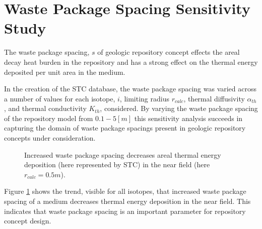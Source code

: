 \section{Waste Package Spacing Sensitivity Study}\label{sec:diffusivity}
The waste package spacing, $s$ of geologic repository concept effects the areal 
decay heat burden in the repository and has a strong effect on the thermal 
energy deposited per unit area in the medium. 

In the creation of the \gls{STC} database, the waste package spacing was varied 
across a number of values for each isotope, $i$, limiting 
radius $r_{calc}$, thermal diffusivity $\alpha_{th}$, and thermal conductivity $K_{th}$, considered.  By 
varying the waste package spacing of the repository model from $0.1-5 [m]$
this sensitivity analysis succeeds in capturing the domain of 
waste package spacings present in geologic repository concepts under 
consideration. 

\begin{figure}[htbp!]
\begin{center}
\end{center}
\caption[$K_{th}$ Sensitivity for Low $\alpha_{th}$]{Increased waste package 
spacing decreases areal thermal energy deposition 
(here represented by \gls{STC}) in the near field (here $r_{calc} = 0.5m$).}
\label{fig:Cm242alpha_kth_low}
\end{figure}

Figure \ref{fig:Cm242alpha_kth_low} shows the trend, visible for all isotopes, 
that increased waste package spacing of a medium decreases thermal energy 
deposition in the near field. This indicates that waste package spacing is 
an important parameter for repository concept design.


